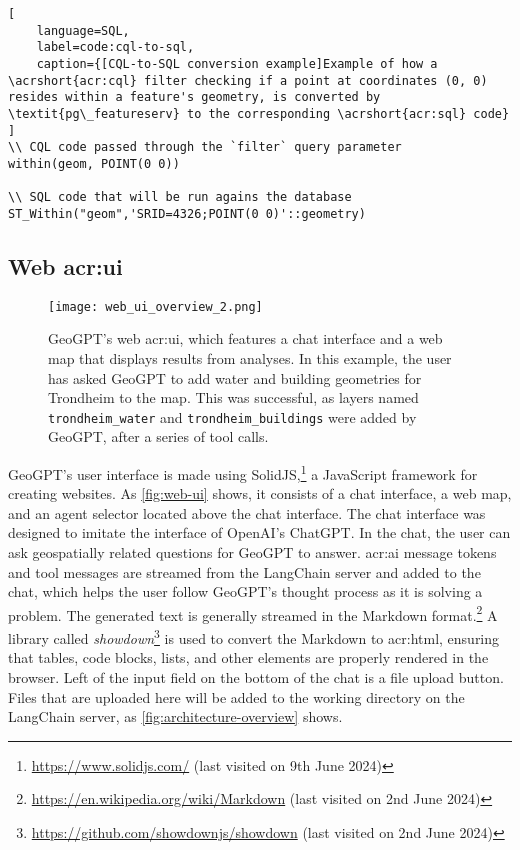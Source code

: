 \begin{lstlisting}[
    language=SQL,
    label=code:cql-to-sql,
    caption={[CQL-to-SQL conversion example]Example of how a \acrshort{acr:cql} filter checking if a point at coordinates (0, 0) resides within a feature's geometry, is converted by \textit{pg\_featureserv} to the corresponding \acrshort{acr:sql} code} 
]
\\ CQL code passed through the `filter` query parameter
within(geom, POINT(0 0))

\\ SQL code that will be run agains the database
ST_Within("geom",'SRID=4326;POINT(0 0)'::geometry)
\end{lstlisting}


\subsection[Web UI]{Web \acrshort{acr:ui}}
\label{subsec:web-ui}

\begin{figure}[h]
    \centering
    \texttt{[image: web\_ui\_overview\_2.png]}
    \caption[GeoGPT's web UI]{GeoGPT's web \acrshort{acr:ui}, which features a chat interface and a web map that displays results from analyses. In this example, the user has asked GeoGPT to add water and building geometries for Trondheim to the map. This was successful, as layers named \texttt{trondheim\_water} and \texttt{trondheim\_buildings} were added by GeoGPT, after a series of tool calls.}
    \label{fig:web-ui}
\end{figure}

GeoGPT's user interface is made using SolidJS,\footnote{\url{https://www.solidjs.com/} (last visited on 9th June 2024)} a JavaScript framework for creating websites. As \autoref{fig:web-ui} shows, it consists of a chat interface, a web map, and an agent selector located above the chat interface. The chat interface was designed to imitate the interface of OpenAI's ChatGPT. In the chat, the user can ask geospatially related questions for GeoGPT to answer. \acrshort{acr:ai} message tokens and tool messages are streamed from the LangChain server and added to the chat, which helps the user follow GeoGPT's thought process as it is solving a problem. The generated text is generally streamed in the Markdown format.\footnote{\url{https://en.wikipedia.org/wiki/Markdown} (last visited on 2nd June 2024)} A library called \textit{showdown}\footnote{\url{https://github.com/showdownjs/showdown} (last visited on 2nd June 2024)} is used to convert the Markdown to \acrshort{acr:html}, ensuring that tables, code blocks, lists, and other elements are properly rendered in the browser. Left of the input field on the bottom of the chat is a file upload button. Files that are uploaded here will be added to the working directory on the LangChain server, as \autoref{fig:architecture-overview} shows.

